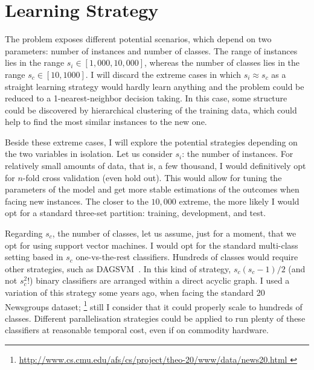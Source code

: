\documentclass{sig-alternate-05-2015}
\begin{document}

\section{Learning Strategy}
\label{sec:learning}
The problem exposes different potential scenarios, which depend on two 
parameters: number of instances and number of classes. The range of instances 
lies in the range $s_i\in [1,000, 10,000]$, whereas the number of classes lies 
in the range $s_c\in [10,1000]$. I will discard the extreme cases in which 
$s_i\approx s_c$ as a straight learning strategy would hardly learn anything and 
the problem could be reduced to a 1-nearest-neighbor decision taking. In this 
case, some structure could be discovered by hierarchical clustering of the 
training data, which could help to find the most similar instances to the new 
one. 

Beside these extreme cases, I will explore the potential strategies depending on 
the two variables in isolation. Let us consider $s_i$: the number of instances. 
For relatively small amounts of data, that is, a few thousand, I would 
definitively opt for $n$-fold cross validation (even hold out). This would allow 
for tuning the parameters of the model and get more stable estimations of the 
outcomes when facing new instances. The closer to the $10,000$ extreme, the more 
likely I would opt for a standard three-set partition: training, development, 
and test. 

Regarding $s_c$, the number of classes, let us assume, just for a moment, that 
we opt for using support vector machines. I would opt for the standard 
multi-class setting based in $s_c$ one-vs-the-rest classifiers. Hundreds of 
classes would require other strategies, such as 
DAGSVM~\cite{large-margin-dags-for-multiclass-classification}. In this kind of 
strategy, $s_c(s_c-1)/2$ (and not $s_c^2$!) binary classifiers are arranged 
within a direct acyclic graph. I used a variation of this strategy some years 
ago, when facing the standard 20 Newsgroups dataset;%
\footnote{\url{http://www.cs.cmu.edu/afs/cs/project/theo-20/www/data/news20.html
}}
still I consider that it could properly scale to hundreds of classes. Different 
parallelisation strategies could be applied to run plenty of these classifiers 
at reasonable temporal cost, even if on commodity hardware.
\end{document}
